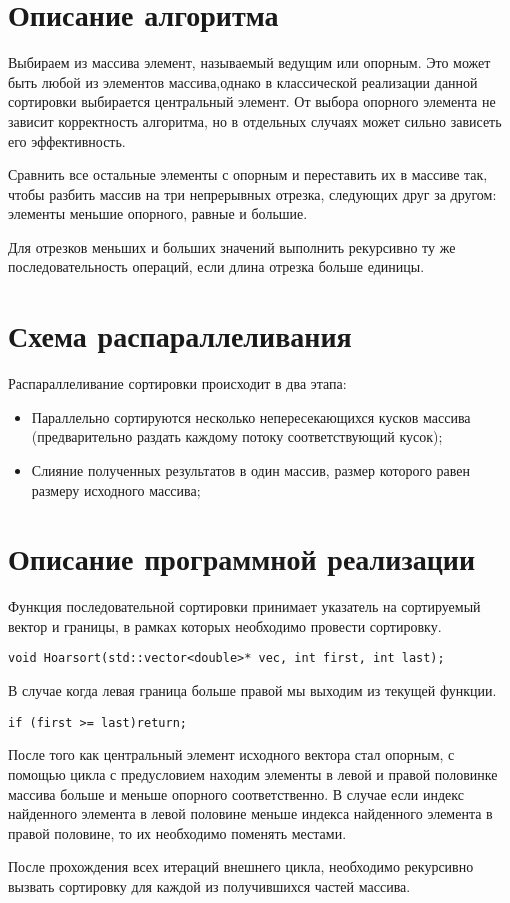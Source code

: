 \documentclass{report}
\begin{document}
\newpage

\section*{Описание алгоритма}
\par Выбираем из массива элемент, называемый ведущим или опорным. Это может быть любой из элементов массива,однако в классической реализации данной сортировки выбирается центральный элемент. От выбора опорного элемента не зависит корректность алгоритма, но в отдельных случаях может сильно зависеть его эффективность.
\par Сравнить все остальные элементы с опорным и переставить их в массиве так, чтобы разбить массив на три непрерывных отрезка, следующих друг за другом: элементы меньшие опорного, равные и большие.
\par Для отрезков меньших и больших значений выполнить рекурсивно ту же последовательность операций, если длина отрезка больше единицы.

\newpage

\section*{Схема распараллеливания}
Распараллеливание сортировки происходит в два этапа:
\begin{itemize}
\item Параллельно сортируются несколько непересекающихся кусков массива (предварительно раздать каждому потоку соответствующий кусок);
\item Слияние полученных результатов в один массив, размер которого равен размеру исходного массива;
\end{itemize}
\newpage

\section*{Описание программной реализации}
Функция последовательной сортировки принимает указатель на сортируемый вектор и границы, в рамках которых необходимо провести сортировку.
\begin{lstlisting}
void Hoarsort(std::vector<double>* vec, int first, int last);
\end{lstlisting}
\par В случае когда левая граница больше правой мы выходим из текущей функции.
\begin{lstlisting}
if (first >= last)return;
\end{lstlisting}
\par После того как центральный элемент исходного вектора стал опорным, с помощью цикла с предусловием находим элементы в левой и правой половинке массива больше  и меньше опорного соответственно. В случае если  индекс найденного элемента в левой половине меньше индекса найденного элемента в правой половине, то их необходимо поменять местами.
\par После прохождения всех итераций внешнего цикла, необходимо рекурсивно вызвать сортировку для каждой из получившихся частей массива.  
\end{document}

